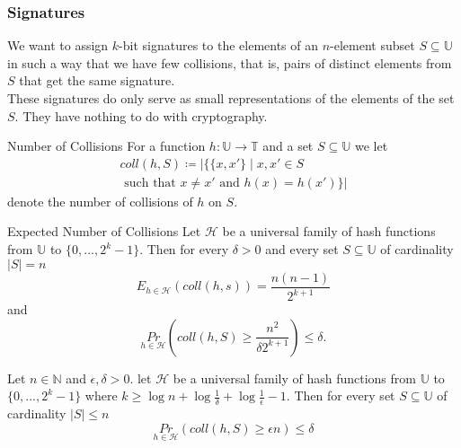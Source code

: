 \documentclass{panikzettel}
\begin{document}
\subsubsection{Signatures}
\begin{halfboxl}
\vspace{-\baselineskip}
	We want to assign $k$-bit signatures to the elements of an $n$-element subset $S\subseteq \mathbb{U}$ in such a way that we have few collisions, that is, pairs of distinct elements from $S$ that get the same signature.\\
	These signatures do only serve as small representations of the elements of the set $S$. They have nothing to do with cryptography.
\end{halfboxl}
\begin{halfboxr}
\vspace{-\baselineskip}
	\begin{defi}{Number of Collisions}
	For a function $h:\mathbb{U}\to\mathbb{T}$ and a set $S\subseteq \mathbb{U}$ we let
	\begin{multline}
	coll(h,S)\coloneqq |\{\{x,x'\}\mid x,x'\in S \\
	\text{ such that } x\neq x' \text{ and } h(x)=h(x') \}|
	\end{multline}
	denote the number of collisions of $h$ on $S$.
	\end{defi}
\end{halfboxr}

\begin{halfboxl}
\vspace{-\baselineskip}
	\begin{theo}{Expected Number of Collisions}
	Let $\mathcal{H}$ be a universal family of hash functions from $\mathbb{U}$ to $\{0,...,2^k-1 \}$. Then for every $\delta>0$ and every set $S\subseteq \mathbb{U}$ of cardinality $|S|=n$
	\[
	E_{h\in\mathcal{H}}(coll(h,s))=\frac{n(n-1)}{2^{k+1}}
	\]
	and
	\[
	\underset{h\in\mathcal{H}}{Pr}\left( coll(h,S) \geq \frac{n^2}{\delta 2^{k+1}} \right)\leq \delta.
	\]
	\end{theo}
\end{halfboxl}
\begin{halfboxr}
\vspace{-\baselineskip}
	\begin{theo}{}
	Let $n\in\mathbb{N}$ and $\epsilon, \delta>0$. let $\mathcal{H}$ be a universal family of hash functions from $\mathbb{U}$ to $\{0,...,2^{k}-1\}$ where $k\geq \log n + \log \frac{1}{\delta}+\log \frac{1}{\epsilon}-1$. Then for every set $S\subseteq \mathbb{U}$ of cardinality $|S| \leq n$
	\[
	\underset{h\in\mathcal{H}}{Pr}(coll(h,S)\geq \epsilon n)\leq \delta
	\]
	\end{theo}
\end{halfboxr}
\end{document}
